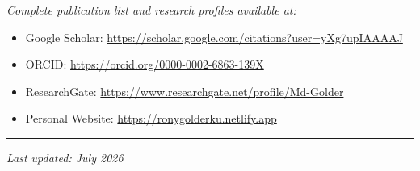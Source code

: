 \documentclass[11pt,a4paper,sans]{moderncv}
\begin{document}
\vspace{0.5cm}
\textit{Complete publication list and research profiles available at:}
\begin{itemize}
  \item Google Scholar: \url{https://scholar.google.com/citations?user=yXg7upIAAAAJ}
  \item ORCID: \url{https://orcid.org/0000-0002-6863-139X}
  \item ResearchGate: \url{https://www.researchgate.net/profile/Md-Golder}
  \item Personal Website: \url{https://ronygolderku.netlify.app}
\end{itemize}

\vspace{0.3cm}
\hrule
\vspace{0.2cm}
\centering
\textit{Last updated: July 2026}
\end{document}
